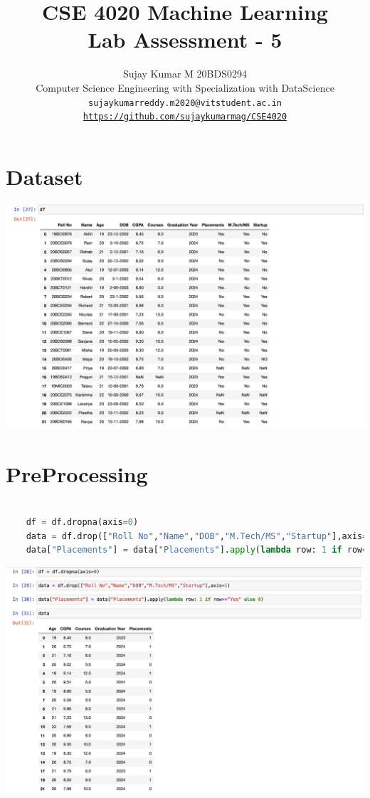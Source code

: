 \documentclass{article}
\title{CSE 4020 Machine Learning \\ Lab Assessment - 5  }
\author{Sujay Kumar M 20BDS0294\\ \small Computer Science Engineering with Specialization with DataScience\\ \tt sujaykumarreddy.m2020@vitstudent.ac.in
	\\ \url{https://github.com/sujaykumarmag/CSE4020}}
\begin{document}
\maketitle
\section{Dataset}
\includegraphics[scale=0.45]{images/1.png}
\break
\section{PreProcessing}
\begin{lstlisting}[language=Python]
	
	df = df.dropna(axis=0)
	data = df.drop(["Roll No","Name","DOB","M.Tech/MS","Startup"],axis=1)
	data["Placements"] = data["Placements"].apply(lambda row: 1 if row=="Yes" else 0)
\end{lstlisting}	
\includegraphics[scale=0.45]{images/2.png}
\end{document}

